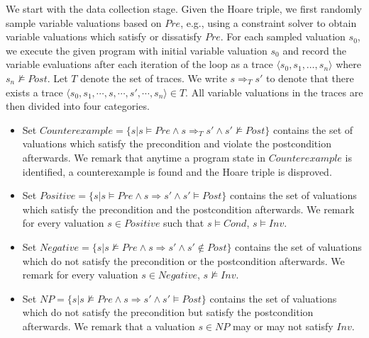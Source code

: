 We start with the data collection stage. Given the Hoare triple, we first randomly sample variable valuations based on $\mathit{Pre}$, e.g., using a constraint solver to obtain variable valuations which satisfy or dissatisfy $\mathit{Pre}$. For each sampled valuation $s_0$, we execute the given program with initial variable valuation $s_0$ and record the variable evaluations after each iteration of the loop as a trace $\langle s_0, s_1, \ldots, s_n \rangle$ where $s_n \not \models \mathit{Post}$. Let $T$ denote the set of traces. We write $s \Rightarrow_T s'$ to denote that there exists a trace $\langle s_0, s_1, \cdots, s, \cdots, s', \cdots, s_n \rangle \in T$.
All variable valuations in the traces are then divided into four categories.
\begin{itemize}
    \item Set $Counterexample = \{s | s \models Pre \land s \Rightarrow_T s' \land s' \not \models Post\}$ contains the set of valuations which satisfy the precondition and violate the postcondition afterwards. We remark that anytime a program state in $Counterexample$ is identified, a counterexample is found and the Hoare triple is disproved.
    \item Set $Positive = \{s | s \models Pre \land s \Rightarrow s' \land s' \models Post\}$ contains the set of valuations which satisfy the precondition and the postcondition afterwards. We remark for every valuation $s \in Positive$ such that $s \models Cond$, $s \models Inv$.
    \item Set $Negative = \{s | s \not \models Pre \land s \Rightarrow s' \land s' \not \in Post\}$ contains the set of valuations which do not satisfy the precondition or the postcondition afterwards. We remark for every valuation $s \in Negative$, $s \not \models Inv$.
    \item Set $NP = \{s | s \not \models Pre \land s \Rightarrow s' \land s' \models Post\}$ contains the set of valuations which do not satisfy the precondition but satisfy the postcondition afterwards. We remark that a valuation $s \in NP$ may or may not satisfy $Inv$.
\end{itemize}
%
%
